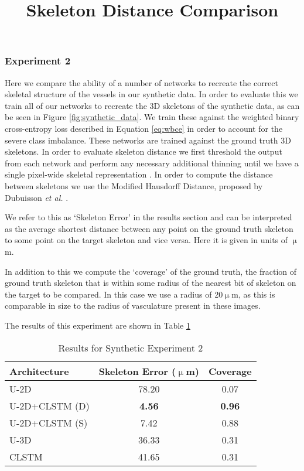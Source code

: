 \documentclass[journal,transmag]{IEEEtran}
\begin{document}
\subsubsection*{Experiment 2}
Here we compare the ability of a number of networks to recreate the correct skeletal structure of the vessels in our synthetic data. In order to evaluate this we train all of our networks to recreate the 3D skeletons of the synthetic data, as can be seen in Figure \ref{fig:synthetic_data}. We train these against the weighted binary cross-entropy loss described in Equation \ref{eq:wbce} in order to account for the severe class imbalance. These networks are trained against the ground truth 3D skeletons. In order to evaluate skeleton distance we first threshold the output from each network and perform any necessary additional thinning until we have a single pixel-wide skeletal representation \cite{Pudney1998}. In order to compute the distance between skeletons we use the Modified Hausdorff Distance, proposed by Dubuisson \emph{et al.} \cite{Dubuisson1994}.


We refer to this as `Skeleton Error' in the results section and can be interpreted as the average shortest distance between any point on the ground truth skeleton to some point on the target skeleton and vice versa. Here it is given in units of $\upmu$m.

In addition to this we compute the `coverage' of the ground truth, the fraction of ground truth skeleton that is within some radius of the nearest bit of skeleton on the target to be compared. In this case we use a radius of 20$\upmu$m, as this is comparable in size to the radius of vasculature present in these images.

The results of this experiment are shown in Table \ref{tab:synth_skel_haus}

\begin{table}[h]
\title{Skeleton Distance Comparison}
\centering
\begin{tabular}{l|c|c}
Architecture & Skeleton Error ($\upmu$m)  & Coverage \\
\hline
U-2D & 78.20 & 0.07 \\
U-2D+CLSTM (D) & \textbf{4.56}  & \textbf{0.96} \\
U-2D+CLSTM (S) & 7.42  & 0.88 \\
U-3D &  36.33  & 0.31 \\
CLSTM & 41.65  & 0.31 \\
\end{tabular}
\caption{Results for Synthetic Experiment 2}
\label{tab:synth_skel_haus}
\end{table}
\end{document}
